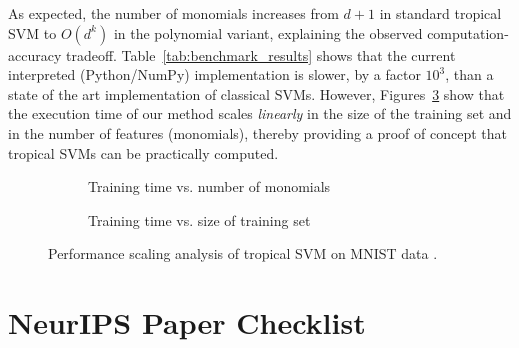 \documentclass{article}
\begin{document}
As expected, the number of monomials increases from $d+1$ in standard tropical SVM to $O(d^k)$ in the polynomial variant, explaining the observed computation-accuracy tradeoff. Table~\ref{tab:benchmark_results}
shows that the current interpreted (Python/NumPy) implementation is slower, by a factor $10^3$, than a state of the art implementation of classical SVMs. However, Figures~\ref{fig:scaling_analysis} show that the execution time of our method scales {\em linearly} in the size of the training set and in the number of features (monomials), thereby providing
a proof of concept that tropical SVMs can be practically computed.


\begin{figure}[htbp]
    \centering
    \begin{subfigure}{0.48\textwidth}
        \centering
        \resizebox{0.95\textwidth}{!}{}
        \caption{Training time vs. number of monomials}
        \label{fig:pca_degree_scaling}
    \end{subfigure}
    \hfill
    \begin{subfigure}{0.48\textwidth}
        \centering
        \resizebox{0.95\textwidth}{!}{}
        \caption{Training time vs. size of training set}
        \label{fig:sample_size_scaling}
    \end{subfigure}
    \caption{Performance scaling analysis of tropical SVM on MNIST data \cite{MNIST}.}
    \label{fig:scaling_analysis}
\end{figure}


\newpage
\section*{NeurIPS Paper Checklist}
\end{document}
